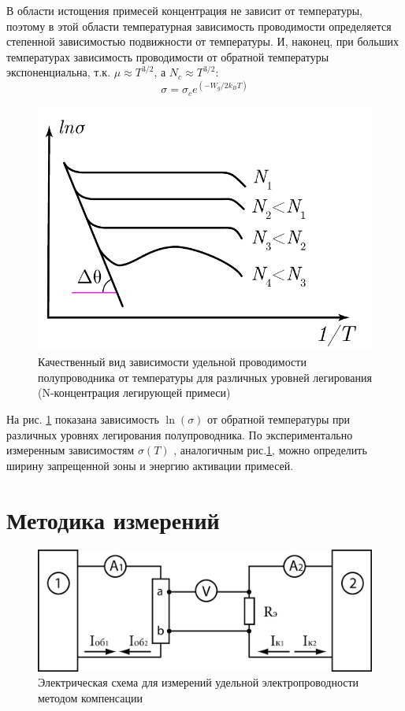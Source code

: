 В области истощения примесей концентрация не зависит от температуры, поэтому в этой области температурная зависимость проводимости определяется
степенной зависимостью подвижности от температуры. И, наконец, при больших температурах зависимость проводимости от
обратной температуры экспоненциальна, т.к. $\mu \approx T^{3/2}$, а  $N_c \approx T^{3/2}$:
 \begin{equation}
	\sigma=\sigma_{c} e^{\left(-W_{g} / 2 k_{B} T\right)}
	 \label{eq:4.4}
 \end{equation}
 \begin{figure}[h!]
	\centering
	\includegraphics[width = .5\linewidth]{img/41}
	\caption{Качественный вид зависимости удельной проводимости полупроводника от температуры для различных уровней легирования (N-концентрация легирующей примеси)}
	\label{fig:4.1}
\end{figure}
На рис. \ref{fig:4.1} показана зависимость $\ln(\sigma)$ от обратной температуры при различных уровнях легирования полупроводника. По
экспериментально измеренным зависимостям $\sigma(T)$ , аналогичным рис.\ref{fig:4.1}, можно определить ширину запрещенной зоны и
энергию активации примесей. 



\newpage
\section{Методика измерений}

\begin{figure}[h!]
	\centering
	\includegraphics[width = .9\linewidth]{img/scheme.jpg}
	\caption{Электрическая схема для измерений удельной электропроводности методом компенсации}
	\label{fig:5.1}
\end{figure}

